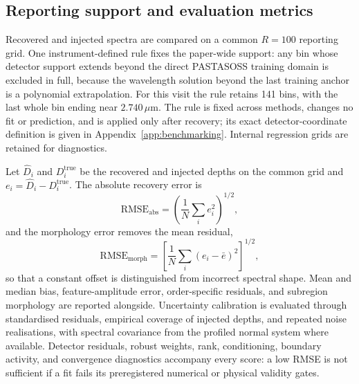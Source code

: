 \subsection{Reporting support and evaluation metrics}


Recovered and injected spectra are compared on a common $R=100$ reporting
grid. One instrument-defined rule fixes the paper-wide support: any bin
whose detector support extends beyond the direct PASTASOSS training domain
is excluded in full, because the wavelength solution beyond the last
training anchor is a polynomial extrapolation. For this visit the rule
retains 141 bins, with the last whole bin ending near $2.740\,\mu\mathrm{m}$.
The rule is fixed across methods, changes no fit or prediction, and is
applied only after recovery; its exact detector-coordinate definition is
given in Appendix~\ref{app:benchmarking}. Internal regression grids are
retained for diagnostics.

Let $\widehat D_i$ and $D_i^{\mathrm{true}}$ be the recovered and injected
depths on the common grid and $e_i=\widehat D_i-D_i^{\mathrm{true}}$. The
absolute recovery error is
\begin{equation}
 \mathrm{RMSE}_{\mathrm{abs}}=
 \left(\frac{1}{N}\sum_i e_i^2\right)^{1/2},
 \label{eq:absolute-rmse}
\end{equation}
and the morphology error removes the mean residual,
\begin{equation}
 \mathrm{RMSE}_{\mathrm{morph}}=
 \left[\frac{1}{N}\sum_i(e_i-\bar e)^2\right]^{1/2},
 \label{eq:morphology-rmse}
\end{equation}
so that a constant offset is distinguished from incorrect spectral shape.
Mean and median bias, feature-amplitude error, order-specific residuals, and
subregion morphology are reported alongside. Uncertainty calibration is
evaluated through standardised residuals, empirical coverage of injected
depths, and repeated noise realisations, with spectral covariance from the
profiled normal system where available. Detector residuals, robust weights,
rank, conditioning, boundary activity, and convergence diagnostics accompany
every score: a low RMSE is not sufficient if a fit fails its preregistered
numerical or physical validity gates.

